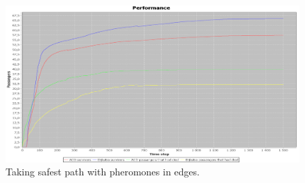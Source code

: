 \begin{figure} [h]
\centering
\hspace*{-1.0in}
\includegraphics[scale=0.35]{images/Graph-using-1000-rounds-140-passangers-safestpath-and-one-fire-high-panic.png}
\caption{Taking safest path with pheromones in edges.}
\label{fig:celebSafeHpanic}
\end{figure}
